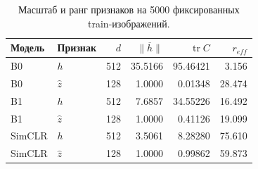 \begin{table}[H]\centering\small
\setlength{\tabcolsep}{4pt}
\caption{Масштаб и ранг признаков на 5000 фиксированных train-изображений.}\label{tab:diagnostics}
\begin{tabular}{llrrrr}
\toprule
Модель & Признак & $d$ & $\overline{\|h\|}$ & $\operatorname{tr}C$ & $r_{eff}$ \\
\midrule
B0 & $h$ & 512 & 35.5166 & 95.46421 & 3.156 \\
B0 & $\hat z$ & 128 & 1.0000 & 0.01348 & 28.474 \\
B1 & $h$ & 512 & 7.6857 & 34.55226 & 16.492 \\
B1 & $\hat z$ & 128 & 1.0000 & 0.41126 & 19.099 \\
SimCLR & $h$ & 512 & 3.5061 & 8.28280 & 75.610 \\
SimCLR & $\hat z$ & 128 & 1.0000 & 0.99862 & 59.873 \\
\bottomrule
\end{tabular}
\end{table}
